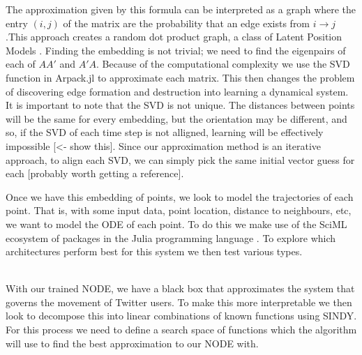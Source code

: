 \documentclass[12pt]{article}
\begin{document}
    The approximation given by this formula can be interpreted as a graph where the entry $(i,j)$ of the matrix are the probability that an edge exists from $i \rightarrow j$.This approach creates a random dot product graph, a class of Latent Position Models \cite{hoff2002latent}. Finding the embedding is not trivial; we need to find the eigenpairs of each of $AA'$ and $A'A$. Because of the computational complexity we use the SVD function in Arpack.jl to approximate each matrix. This then changes the problem of discovering edge formation and destruction into learning a dynamical system.\\
    It is important to note that the SVD is not unique. The distances between points will be the same for every embedding, but the orientation may be different, and so, if the SVD of each time step is not alligned, learning will be effectively impossible [<- show this]. Since our approximation method is an iterative approach, to align each SVD, we can simply pick the same initial vector guess for each [probably worth getting a reference].  
    
    Once we have this embedding of points, we look to model the trajectories of each point. That is, with some input data, point location, distance to neighbours, etc, we want to model the ODE of each point. To do this we make use of the SciML ecosystem of packages in the Julia programming language \cite{SciML_C_Rak}. To explore which architectures perform best for this system we then test various types. ~~~~~~~~~~~~~~~~~~~~~~~~
    
    With our trained NODE, we have a black box that approximates the system that governs the movement of Twitter users. To make this more interpretable we then look to decompose this into linear combinations of known functions using SINDY. For this process we need to define a search space of functions which the algorithm will use to find the best approximation to our NODE with. 
    
    
    
    
    
    
    
\end{document}
